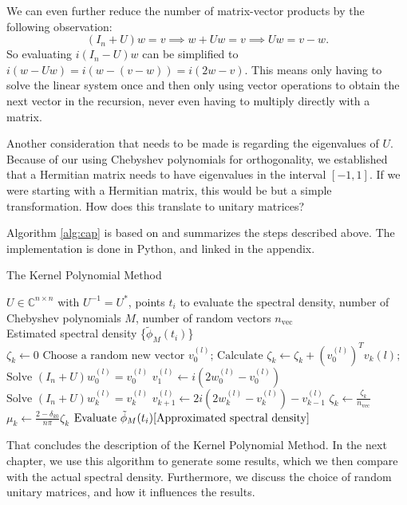 We can even further reduce the number of matrix-vector products by the following observation: 
\[
(I_n + U) w = v \implies w + Uw = v \implies Uw = v - w.
\]
So evaluating $i(I_n - U)w$ can be simplified to $i(w - Uw) = i(w - (v - w)) = i(2w - v)$. This means only having to solve the linear system once and then only using vector operations to obtain the next vector in the recursion, never even having to multiply directly with a matrix.

Another consideration that needs to be made is regarding the eigenvalues of $U$. Because of our using Chebyshev polynomials for orthogonality, we established that a Hermitian matrix needs to have eigenvalues in the interval $[-1, 1]$. If we were starting with a Hermitian matrix, this would be but a simple transformation. How does this translate to unitary matrices?

Algorithm \ref{alg:cap} is based on \cite[p.~10]{linsaadyang14} and summarizes the steps described above.
The implementation is done in Python, and linked in the appendix.

\begin{algorithm}[H]
    \caption{The Kernel Polynomial Method}\label{alg:cap}
    \begin{algorithmic}[5]
    \Require $U \in \mathbb{C}^{n \times n}$ with $U^{-1} = U^*$, points $t_i$ to evaluate the spectral density, number of Chebyshev polynomials $M$, number of random vectors $n_{\text{vec}}$\\
    \Ensure Estimated spectral density \{$\tilde{\phi}_M(t_i)$\}\\
    \State $\zeta_k \gets 0$
    \EndFor
    \State $\text{Choose a random new vector } v_0^{(l)}\text{;}$ 
    \State $\text{Calculate } \zeta_k \gets \zeta_k + \left( v_0^{(l)} \right)^T v_k{(l)}\text{;}$  
    \State $\text{Solve } (I_n + U) w_0^{(l)} = v_0^{(l)}$
    \State $v_1^{(l)} \gets i (2w_0^{(l)} - v_0^{(l)})$
    \Else
    \State $\text{Solve } (I_n + U) w_k^{(l)} = v_k^{(l)}$
    \State $v_{k+1}^{(l)} \gets 2 i (2w_k^{(l)} - v_k^{(l)}) - v_{k-1}^{(l)}$ 
    \EndIf
    \EndFor
    \EndFor
    \State $\zeta_k \gets \frac{\zeta_k}{n_{\text{vec}}}$
    \State $\mu_k \gets \frac{2 - \delta_{k0}}{n \pi} \zeta_k$
    \EndFor
    \State $\text{Evaluate } \tilde{\phi}_M(t_i) \eqref{Approximated spectral density}$
    \end{algorithmic}
\end{algorithm}

That concludes the description of the Kernel Polynomial Method. In the next chapter, we use this algorithm to generate some results, which we then compare with the actual spectral density. Furthermore, we discuss the choice of random unitary matrices, and how it influences the results.